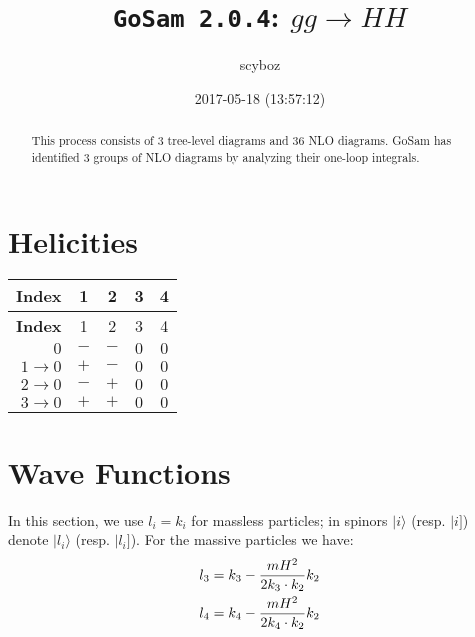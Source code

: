 \documentclass[a4paper]{article}
\title{\texttt{GoSam 2.0.4}: ${g}{g}\rightarrow{H}{H}$}
\author{scyboz}
\date{2017-05-18 (13:57:12)}
\newcommand{\kea}[1]{\vert #1 \rangle}
\newcommand{\keb}[1]{\vert #1 ]}
\begin{document}
\maketitle
\begin{abstract}
\noindent This process consists of 3 tree-level diagrams and 36 NLO diagrams. GoSam has identified 3 groups  of NLO diagrams by analyzing their one-loop integrals.
\end{abstract}
\newpage
\tableofcontents
\newpage

\section{Helicities}

\begin{longtable}[c]{r|cccc}
\bf{Index} &1&2&3&4\\
\hline
\endfirsthead
\bf{Index} &1&2&3&4\\
\hline
\endhead 
$0$& $-$& $-$& $0$& $0$\\
$1\rightarrow 0$& $+$& $-$& $0$& $0$\\
$2\rightarrow 0$& $-$& $+$& $0$& $0$\\
$3\rightarrow 0$& $+$& $+$& $0$& $0$\\
\end{longtable}
\section{Wave Functions}
In this section, we use $l_i=k_i$ for massless particles;
in spinors $\kea{i}$ (resp. $\keb{i}$) denote $\kea{l_i}$ (resp. $\keb{l_i}$).
For the massive particles we have:
\begin{align}
l_{3} &= k_{3} - \frac{mH^2}{%
      2 k_{3}\cdot k_{2}}k_{2}\\
l_{4} &= k_{4} - \frac{mH^2}{%
      2 k_{4}\cdot k_{2}}k_{2}
\end{align}
\end{document}
